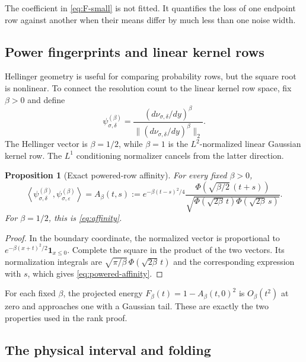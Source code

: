 \documentclass[11pt]{article}
\newtheorem{proposition}[theorem]{Proposition}
\theoremstyle{definition}
\theoremstyle{remark}
\begin{document}
The coefficient in \eqref{eq:F-small} is not fitted.  It quantifies the loss
of one endpoint row against another when their means differ by much less than
one noise width.

\subsection{Power fingerprints and linear kernel rows}

Hellinger geometry is useful for comparing probability rows, but the square
root is nonlinear.  To connect the resolution count to the linear kernel row
space, fix $\beta>0$ and define
\begin{equation}\label{eq:power-fingerprint}
 \psi^{(\beta)}_{\sigma,\delta}
 =\frac{(d\nu_{\sigma,\delta}/dy)^\beta}
 {\|(d\nu_{\sigma,\delta}/dy)^\beta\|_2}.
\end{equation}
The Hellinger vector is $\beta=1/2$, while $\beta=1$ is the
$L^2$-normalized linear Gaussian kernel row.  The $L^1$ conditioning
normalizer cancels from the latter direction.

\begin{proposition}[Exact powered-row affinity]
\label{prop:powered-affinity}
For every fixed $\beta>0$,
\begin{equation}\label{eq:powered-affinity}
 \left\langle
 \psi^{(\beta)}_{\sigma,\delta},
 \psi^{(\beta)}_{\sigma,\varepsilon}
 \right\rangle
 =A_\beta(t,s)
 :=e^{-\beta(t-s)^2/4}
 \frac{\Phi(\sqrt{\beta/2}\,(t+s))}
 {\sqrt{\Phi(\sqrt{2\beta}\,t)
 \Phi(\sqrt{2\beta}\,s)}}.
\end{equation}
For $\beta=1/2$, this is \eqref{eq:affinity}.
\end{proposition}

\begin{proof}
In the boundary coordinate, the normalized vector is proportional to
$e^{-\beta(x+t)^2/2}\mathbf1_{x\le0}$.  Complete the square in the product of
the two vectors.  Its normalization integrals are
$\sqrt{\pi/\beta}\,\Phi(\sqrt{2\beta}\,t)$ and the corresponding expression
with $s$, which gives \eqref{eq:powered-affinity}.
\end{proof}

For each fixed $\beta$, the projected energy
$F_\beta(t)=1-A_\beta(t,0)^2$ is $O_\beta(t^2)$ at zero and approaches one
with a Gaussian tail.  These are exactly the two properties used in the rank
proof.

\subsection{The physical interval and folding}
\end{document}
